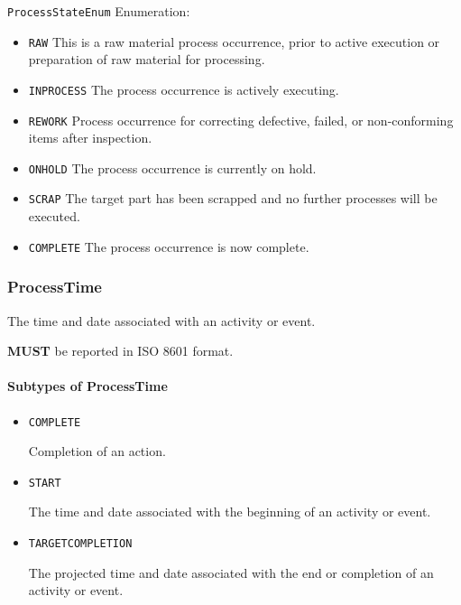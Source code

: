 \texttt{ProcessStateEnum} Enumeration:

\begin{itemize}
\item \texttt{RAW} \newline This is a raw material process occurrence, prior to active execution or preparation of raw material for processing. 
\item \texttt{IN\textunderscore PROCESS} \newline The process occurrence is actively executing.
 
\item \texttt{REWORK} \newline Process occurrence for correcting defective, failed, or non-conforming items after inspection. 
\item \texttt{ON\textunderscore HOLD} \newline The process occurrence is currently on hold. 
\item \texttt{SCRAP} \newline The target part has been scrapped and no further processes will be executed. 
\item \texttt{COMPLETE} \newline The process occurrence is now complete.
 
\end{itemize}

\FloatBarrier

\subsubsection{ProcessTime}
\label{sec:ProcessTime}



The time and date associated with an activity or event.
  
  \textbf{MUST} be reported in ISO 8601 format.


\paragraph{Subtypes of ProcessTime}\mbox{}
\label{sec:Subtypes of ProcessTime}

\begin{itemize}

\item \texttt{COMPLETE}


Completion of an action.

\item \texttt{START}


The time and date associated with the beginning of an activity or event.

\item \texttt{TARGET\textunderscore COMPLETION}


The projected time and date associated with the end or completion of an activity or event.


\end{itemize}

